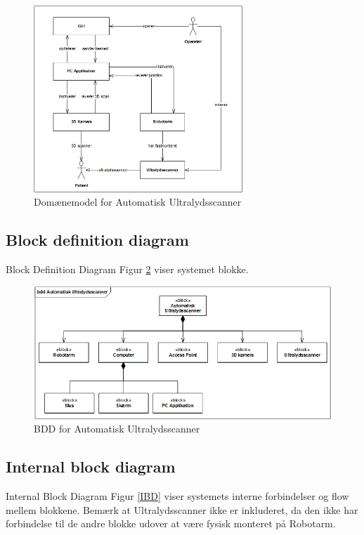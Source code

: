 \begin{figure}[H]
    \centering
    \includegraphics[width=0.7\textwidth]{figurer/d/Design/uml_domain}
    \caption{Domænemodel for Automatisk Ultralydsscanner}
    \label{domain}
\end{figure}

\subsection{Block definition diagram}
Block Definition Diagram Figur \ref{BDD} viser systemet blokke. 

\begin{figure}[H]
    \centering
    \includegraphics[width=1\textwidth]{figurer/d/Design/BDD}
    \caption{BDD for Automatisk Ultralydsscanner}
    \label{BDD}
\end{figure}

\subsection{Internal block diagram}
Internal Block Diagram Figur \ref{IBD}  viser systemets interne forbindelser og flow mellem blokkene. Bemærk at Ultralydsscanner ikke er inkluderet, da den ikke har forbindelse til de andre blokke udover at være fysisk monteret på Robotarm. 

